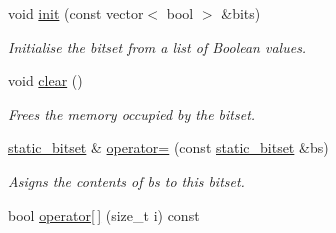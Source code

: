 \begin{DoxyCompactItemize}
void \hyperlink{classlgraph_1_1utils_1_1static__bitset_a761950dac63d9e43b1a7fb8a842e1ee8}{init} (const vector$<$ bool $>$ \&bits)
\begin{DoxyCompactList}\small\item\em Initialise the bitset from a list of Boolean values. \end{DoxyCompactList}\item 
void \hyperlink{classlgraph_1_1utils_1_1static__bitset_a6013f8230ae37554328dfe0884d89c71}{clear} ()
\begin{DoxyCompactList}\small\item\em Frees the memory occupied by the bitset. \end{DoxyCompactList}\item 
\hyperlink{classlgraph_1_1utils_1_1static__bitset}{static\+\_\+bitset} \& \hyperlink{classlgraph_1_1utils_1_1static__bitset_a3215c8066fffcd8eed871914d42c40b8}{operator=} (const \hyperlink{classlgraph_1_1utils_1_1static__bitset}{static\+\_\+bitset} \&bs)
\begin{DoxyCompactList}\small\item\em Asigns the contents of {\itshape bs} to this bitset. \end{DoxyCompactList}\item 
bool \hyperlink{classlgraph_1_1utils_1_1static__bitset_addaadcc59dd1f73eaf5d95095c22b7be}{operator\mbox{[}$\,$\mbox{]}} (size\+\_\+t i) const \hypertarget{classlgraph_1_1utils_1_1static__bitset_addaadcc59dd1f73eaf5d95095c22b7be}{}\label{classlgraph_1_1utils_1_1static__bitset_addaadcc59dd1f73eaf5d95095c22b7be}


\end{DoxyCompactItemize}
